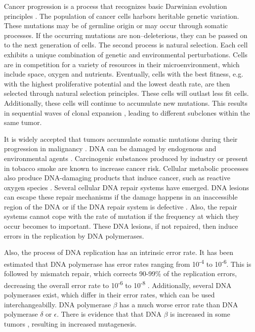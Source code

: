     Cancer progression is a process that recognizes basic Darwinian evolution
    principles {\cite{clonal_evolution}} {\cite{darwinian_models}}
    {\cite{war_zone}} {\cite{cancer_models}}. The population of cancer cells
    harbors heritable genetic variation. These mutations may be of germline
    origin or may occur through somatic processes. If the occurring mutations
    are non--deleterious, they can be passed on to the next generation of cells.
    The second process is natural selection. Each cell exhibits a unique
    combination of genetic and environmental perturbations. Cells are in
    competition for a variety of resources in their microenvironment, which
    include space, oxygen and nutrients. Eventually, cells with the best
    fitness, e.g. with the highest proliferative potential and the lowest death
    rate, are then selected through natural selection principles. These cells
    will outlast less fit cells. Additionally, these cells will continue to
    accumulate new mutations. This results in sequential waves of clonal
    expansion {\cite{clonal_evolution}}, leading to different subclones within
    the same tumor.

    It is widely accepted that tumors accumulate somatic mutations during
    their progression in malignancy {\cite{accumulation_rates}}
    {\cite{mutations_counting}}. DNA can be damaged by endogenous and
    environmental agents {\cite{multiple_mutations}}. Carcinogenic substances produced by industry
    {\cite{occupational_exposure}} {\cite{rubber_industry}} or present in
    tobacco smoke {\cite{smoking_cancer}} are known to increase cancer risk.
    Cellular metabolic processes also produce DNA-damaging products that
    induce cancer, such as reactive oxygen species {\cite{ros_cancer}}
    {\cite{ros_cancer_other}}. Several cellular DNA repair systems have
    emerged. DNA lesions can escape these repair mechanisms if the damage
    happens in an inaccessible region of the DNA or if the DNA repair system
    is defective {\cite{dna_repair}}. Also, the repair systems cannot cope
    with the rate of mutation if the frequency at which they occur becomes to
    important. These DNA lesions, if not repaired, then induce errors in the
    replication by DNA polymerases.

    Also, the process of DNA replication has an intrinsic error rate. It has been
    estimated that DNA polymerase has error rates ranging from
    10\textsuperscript{-4} to 10\textsuperscript{-6}. This is followed by
    mismatch repair, which corrects 90-99\% of the replication errors,
    decreasing the overall error rate to 10\textsuperscript{-6} to
    10\textsuperscript{-8} {\cite{multiple_mutations}}. Additionally, several
    DNA polymerases exist, which differ in their error rates, which can be
    used interchangeabilly. DNA polymerase $\beta$ has a much worse error rate
    than DNA polymerase $\delta$ or $\epsilon$. There is evidence that that
    DNA $\beta$ is increased in some tumors {\cite{dna_pol}}, resulting in
    increased mutagenesis.

